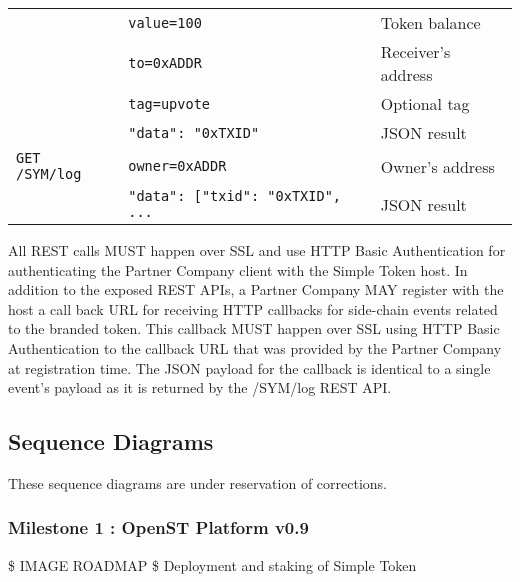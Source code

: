 \documentclass[12pt,a4paper, twocolumn]{article}
\begin{document}
\begin{table}[H]
\begin{tabular}{lll}
& \texttt{value=100}                                                                                                                                    & Token balance            \\
& \texttt{to=0xADDR}                                                                                                                                    & Receiver’s address       \\
& \texttt{tag=upvote}                                                                                                                                   & Optional tag             \\
& \texttt{{"data": "0xTXID"}}                                                                                                                         & JSON result              \\
\texttt{GET /SYM/log}          & \texttt{owner=0xADDR}                                                                                                                                 & Owner’s address          \\
& \texttt{{"data": {[{"txid": "0xTXID"}, ...}}} & JSON result																\end{tabular}
\end{table} 

All REST calls MUST happen over SSL and use HTTP Basic Authentication for authenticating the Partner Company client with the Simple Token host.
In addition to the exposed REST APIs, a Partner Company MAY register with the host a call
back URL for receiving HTTP callbacks for side-chain events related to the branded token. This callback MUST happen over SSL using HTTP Basic Authentication to the callback URL that was provided by the Partner Company at registration time. The JSON payload for the callback is identical to a single event’s payload as it is returned by the /SYM/log REST API.

\subsection{Sequence Diagrams}
These sequence diagrams are under reservation of corrections.

\subsubsection{Milestone 1 : OpenST Platform v0.9}
\$ IMAGE ROADMAP \$
Deployment and staking of Simple Token
\end{document}
